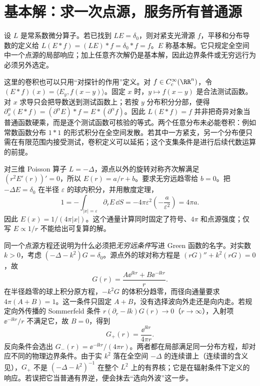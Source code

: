 \section{基本解：求一次点源，服务所有普通源}

设 \(L\) 是常系数微分算子。若已找到 \(LE=\delta_0\)，则对紧支光滑源 \(f\)，平移和分布导数的定义给 \(L(E*f)=(LE)*f=\delta_0*f=f\)。\(E\) 称基本解。它只规定全空间中一个点源的局部响应；加上任意齐次解仍是基本解，因此边界条件或无穷远行为必须另外选定。

这里的卷积也可以只用“对探针的作用”定义。对 \(f\in C_c^\infty(\RR^n)\)，令 \((E*f)(x)=\langle E_y,f(x-y)\rangle\)。固定 \(x\) 时，\(y\mapsto f(x-y)\) 是合法测试函数。对 \(x\) 求导只会把导数送到测试函数上；若按 \(y\) 分布积分分部，便得 \(\partial_x^\alpha(E*f)=(\partial^\alpha E)*f=E*(\partial^\alpha f)\)。因此 \(L(E*f)=f\) 并非把奇异对象当普通函数硬乘，而是逐个测试函数可核验的等式。两个任意分布未必能卷积：例如常数函数分布 \(1*1\) 的形式积分在全空间发散。若其中一方紧支，另一个分布便只需在有限范围内接受测试，卷积定义可以延拓；这个支集条件是进行后续代数运算的前提。

对三维 Poisson 算子 \(L=-\Delta\)，源点以外的旋转对称齐次解满足 \((r^2E'(r))'=0\)，所以 \(E(r)=a/r+b\)。要求无穷远趋零给 \(b=0\)。把 \(-\Delta E=\delta_0\) 在半径 \(\varepsilon\) 的球内积分，并用散度定理，
\[
1=-\int_{|x|=\varepsilon}\partial_rE\,\dd S
=-4\pi\varepsilon^2\left(-\frac a{\varepsilon^2}\right)=4\pi a.
\]
因此 \(E(x)=1/(4\pi|x|)\)。这个通量计算同时固定了符号、\(4\pi\) 和点源强度；仅写 \(E\propto1/r\) 不能给出可复算的解。

同一个点源方程还说明为什么必须把\emph{无穷远条件}写进 Green 函数的名字。对实数 \(k>0\)，考虑 \((-\Delta-k^2)G=\delta_0\)。源点外的球对称方程是 \((rG)''+k^2(rG)=0\)，故
\[
 G(r)=\frac{A\ee^{\ii kr}+B\ee^{-\ii kr}}r.
\]
在半径趋零的球上积分原方程，\(-k^2G\) 的体积分趋零，而径向通量要求 \(4\pi(A+B)=1\)。这一条件只固定 \(A+B\)，没有选择波向外走还是向内走。若规定向外传播的 Sommerfeld 条件 \(r(\partial_r-\ii k)G(r)\to0\)（\(r\to\infty\)），入射项 \(\ee^{-\ii kr}/r\) 不满足它，故 \(B=0\)，得到
\begin{equation}
 G_+(r)=\frac{\ee^{\ii kr}}{4\pi r}.
 \label{eq:math-outgoing-helmholtz}
\end{equation}
反向条件会选出 \(G_-(r)=\ee^{-\ii kr}/(4\pi r)\)。两者都在局部满足同一分布方程，却对应不同的物理边界条件。由于实 \(k^2\) 落在全空间 \(-\Delta\) 的连续谱上（连续谱的含义见），\(G_+\) 不是 \((-\Delta-k^2)^{-1}\) 在整个 \(L^2\) 上的有界核；它是在辐射条件下定义的响应。若误把它当普通有界逆，便会抹去“选向外波”这一步。

